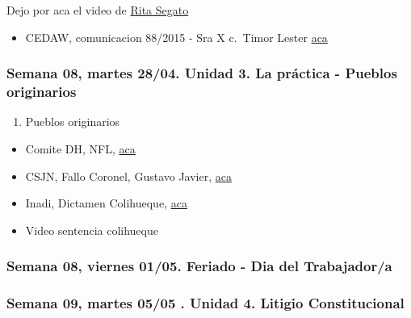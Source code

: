 \documentclass[
]{article}
\providecommand{\tightlist}{%
  \setlength{\itemsep}{0pt}\setlength{\parskip}{0pt}}
\begin{document}
Dejo por aca el video de \href{https://youtu.be/prUqWHKnUd4}{Rita
Segato}

\begin{itemize}
\tightlist
\item
  CEDAW, comunicacion 88/2015 - Sra X c.~Timor Lester
  \href{https://drive.google.com/file/d/1eyLvEJwr0kHy8xZMDpxbthoBAkPDBps0/view?usp=sharing}{aca}
\end{itemize}

\subsubsection{Semana 08, martes 28/04. Unidad 3. La práctica - Pueblos
originarios}\label{semana-08-martes-2804.-unidad-3.-la-pruxe1ctica---pueblos-originarios}

\begin{enumerate}
\def\labelenumi{\alph{enumi}.}
\setcounter{enumi}{5}
\tightlist
\item
  Pueblos originarios
\end{enumerate}

\begin{itemize}
\item
  Comite DH, NFL,
  \href{https://drive.google.com/file/d/1CP_TpEaI6XXZIb3ACuyqa8XFPuvbdR3f/view?usp=sharing}{aca}
\item
  CSJN, Fallo Coronel, Gustavo Javier,
  \href{https://drive.google.com/file/d/1kslBUCofBjqzYSqUjl-dV5q7sZo_unnV/view?usp=sharing}{aca}
\item
  Inadi, Dictamen Colihueque,
  \href{https://drive.google.com/file/d/1_t9jnOgqHc9qw7PyU6nuJS0_VORXtdLj/view?usp=sharing¨}{aca}
\item
  Video sentencia colihueque
\end{itemize}

\subsubsection{\texorpdfstring{{Semana 08, viernes 01/05. Feriado - Dia
del
Trabajador/a}}{Semana 08, viernes 01/05. Feriado - Dia del Trabajador/a}}\label{semana-08-viernes-0105.-feriado---dia-del-trabajadora}

\subsubsection{Semana 09, martes 05/05 . Unidad 4. Litigio
Constitucional}\label{semana-09-martes-0505-.-unidad-4.-litigio-constitucional}
\end{document}
